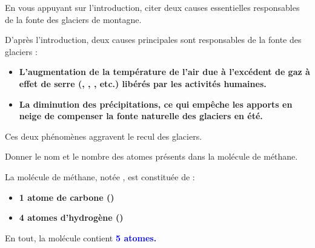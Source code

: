 \documentclass[answers]{exam}
\begin{document}
\begin{questions}

  \question[2] En vous appuyant sur l'introduction, citer deux causes essentielles responsables de la fonte des glaciers de montagne.
  \begin{solution}
    D'après l'introduction, deux causes principales sont responsables de la fonte des glaciers :
    \begin{itemize}[noitemsep]
        \item \textbf{L'augmentation de la température de l'air due à l'excédent de gaz à effet de serre (, , , etc.) libérés par les activités humaines.}
        \item \textbf{La diminution des précipitations, ce qui empêche les apports en neige de compenser la fonte naturelle des glaciers en été.}
    \end{itemize}
    Ces deux phénomènes aggravent le recul des glaciers.
  \end{solution}

  \question[1] Donner le nom et le nombre des atomes présents dans la molécule de méthane.
  \begin{solution}
    La molécule de méthane, notée , est constituée de :
    \begin{itemize}[noitemsep]
        \item \textbf{1 atome de carbone ()}
        \item \textbf{4 atomes d'hydrogène ()}
    \end{itemize}
    En tout, la molécule contient \textcolor{blue}{\textbf{5 atomes.}}
  \end{solution}


\end{questions}
\end{document}
